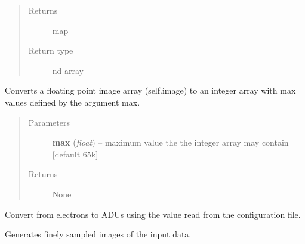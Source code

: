 \documentclass[a4paper,12pt,english]{sphinxmanual}
\begin{document}
\begin{fulllineitems}
\begin{fulllineitems}
\begin{quote}
\begin{description}
\begin{itemize}
\end{itemize}

\item[{Returns}] \leavevmode
map

\item[{Return type}] \leavevmode
nd-array

\end{description}\end{quote}

\end{fulllineitems}


\begin{fulllineitems}
\label{simulator:simulator.simulator.VISsimulator.discretise}
Converts a floating point image array (self.image) to an integer array with max values
defined by the argument max.
\begin{quote}\begin{description}
\item[{Parameters}] \leavevmode
\textbf{max} (\emph{float}) -- maximum value the the integer array may contain {[}default 65k{]}

\item[{Returns}] \leavevmode
None

\end{description}\end{quote}

\end{fulllineitems}


\begin{fulllineitems}
\label{simulator:simulator.simulator.VISsimulator.electrons2ADU}
Convert from electrons to ADUs using the value read from the configuration file.

\end{fulllineitems}


\begin{fulllineitems}
\label{simulator:simulator.simulator.VISsimulator.generateFinemaps}
Generates finely sampled images of the input data.


\end{fulllineitems}
\end{fulllineitems}
\end{document}
